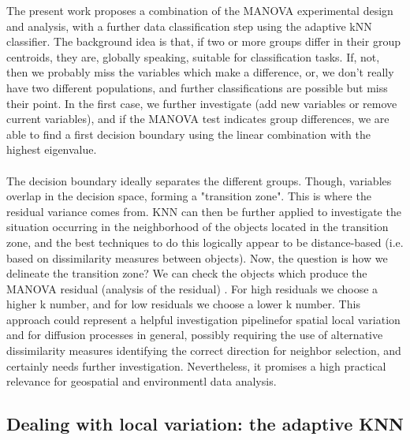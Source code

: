 \documentclass {article}
\begin{document}
The present work proposes a combination of the MANOVA experimental design and analysis, with a further data classification step using the adaptive kNN classifier. 
The background idea is that, if two or more groups differ in their group centroids, they are, globally speaking, suitable for classification tasks. If, not, then we probably miss the variables which make a difference, or, we don't really have two different populations, and further classifications are possible but miss their point.
In the first case, we further investigate (add new variables or remove current variables), and if the MANOVA test indicates group differences, we are able to find a first decision boundary using the linear combination with the highest eigenvalue.
\\
\\
 The decision boundary ideally separates the different groups.
 Though, variables overlap in the decision space, forming a "transition zone". This is where the residual variance comes from. 
KNN can then be further applied to investigate the situation occurring in the neighborhood of the objects located in the transition zone, and the best techniques to do this logically appear to be distance-based (i.e. based on dissimilarity measures between objects). 
Now, the question is how we delineate the transition zone? We can check the objects which produce the MANOVA residual (analysis of the residual) \cite{quinn_experimental_2002}.        
For high residuals we choose a higher k number, and for low residuals we choose a lower k number. This approach could represent a helpful investigation pipelinefor spatial local variation and for diffusion processes in general, possibly requiring the use of alternative dissimilarity measures identifying the correct direction for neighbor selection, and certainly needs further investigation. 
 Nevertheless, it promises a high practical relevance for geospatial and environmentl data analysis.
 
\subsection {Dealing with local variation: the adaptive KNN}
\end{document}
